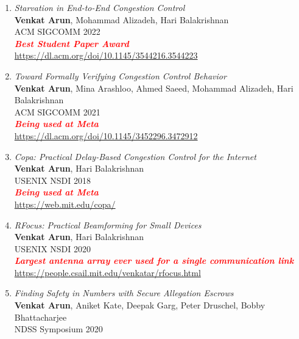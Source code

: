 \documentclass[notitlepage]{article}
\newcommand{\highlight}[1]{\textcolor{red}{\textit{\textbf{#1}}}}
\begin{document}
\begin{enumerate}
\item {\it Starvation in End-to-End Congestion Control}\label{paper:starvation}\\
  {\bf Venkat Arun}, Mohammad Alizadeh, Hari Balakrishnan\\
  ACM SIGCOMM 2022\\
  \highlight{Best Student Paper Award}\\
  \url{https://dl.acm.org/doi/10.1145/3544216.3544223}\\
\item {\it Toward Formally Verifying Congestion Control Behavior}\label{paper:ccac}\\
  {\bf Venkat Arun}, Mina Arashloo, Ahmed Saeed, Mohammad Alizadeh, Hari Balakrishnan\\
  ACM SIGCOMM 2021\\
  \highlight{Being used at Meta}\\
  \url{https://dl.acm.org/doi/10.1145/3452296.3472912}\\
\item {\it Copa: Practical Delay-Based Congestion Control for the Internet}\label{paper:copa}\\
  {\bf Venkat Arun}, Hari Balakrishnan\\
  USENIX NSDI 2018\\
  \highlight{Being used at Meta}\\
  \url{https://web.mit.edu/copa/}\\
\item {\it RFocus: Practical Beamforming for Small Devices}\label{paper:rfocus}\\
  {\bf Venkat Arun}, Hari Balakrishnan\\
  USENIX NSDI 2020\\
  \highlight{Largest antenna array ever used for a single communication link}\\
  \url{https://people.csail.mit.edu/venkatar/rfocus.html}
\\
\item {\it Finding Safety in Numbers with Secure Allegation Escrows} \\
  {\bf Venkat Arun}, Aniket Kate, Deepak Garg, Peter Druschel, Bobby Bhattacharjee \\
  NDSS Symposium 2020\\

\end{enumerate}
\end{document}

